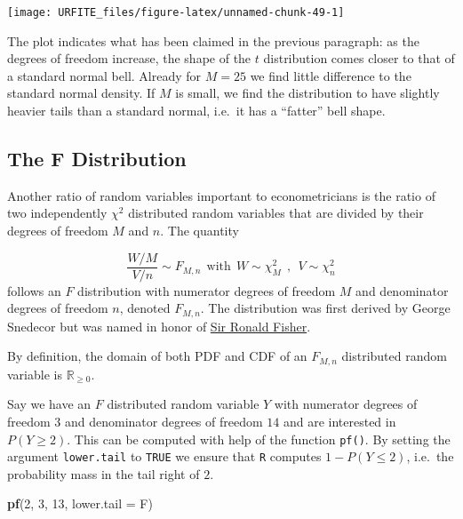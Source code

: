 \documentclass[]{book}
\newenvironment{Shaded}{\begin{snugshade}}{\end{snugshade}}
\newcommand{\KeywordTok}[1]{\textcolor[rgb]{0.13,0.29,0.53}{\textbf{#1}}}
\newcommand{\DataTypeTok}[1]{\textcolor[rgb]{0.13,0.29,0.53}{#1}}
\newcommand{\DecValTok}[1]{\textcolor[rgb]{0.00,0.00,0.81}{#1}}
\newcommand{\NormalTok}[1]{#1}
\theoremstyle{definition}
\theoremstyle{definition}
\theoremstyle{definition}
\theoremstyle{remark}
\begin{document}
\begin{center}\texttt{[image: URFITE\_files/figure-latex/unnamed-chunk-49-1]} \end{center}

The plot indicates what has been claimed in the previous paragraph: as
the degrees of freedom increase, the shape of the \(t\) distribution
comes closer to that of a standard normal bell. Already for \(M=25\) we
find little difference to the standard normal density. If \(M\) is
small, we find the distribution to have slightly heavier tails than a
standard normal, i.e.~it has a ``fatter'' bell shape.

\subsection*{The F Distribution}\label{the-f-distribution}

Another ratio of random variables important to econometricians is the
ratio of two independently \(\chi^2\) distributed random variables that
are divided by their degrees of freedom \(M\) and \(n\). The quantity

\[ \frac{W/M}{V/n} \sim F_{M,n} \ \ \text{with} \ \ W \sim \chi^2_M \ \ , \ \ V \sim \chi^2_n \]
follows an \(F\) distribution with numerator degrees of freedom \(M\)
and denominator degrees of freedom \(n\), denoted \(F_{M,n}\). The
distribution was first derived by George Snedecor but was named in honor
of \href{https://en.wikipedia.org/wiki/Ronald_Fisher}{Sir Ronald
Fisher}.

By definition, the domain of both PDF and CDF of an \(F_{M,n}\)
distributed random variable is \(\mathbb{R}_{\geq0}\).

Say we have an \(F\) distributed random variable \(Y\) with numerator
degrees of freedom \(3\) and denominator degrees of freedom \(14\) and
are interested in \(P(Y \geq 2)\). This can be computed with help of the
function \texttt{pf()}. By setting the argument \texttt{lower.tail} to
\texttt{TRUE} we ensure that \texttt{R} computes \(1- P(Y \leq 2)\),
i.e.~the probability mass in the tail right of \(2\).

\begin{Shaded}
\begin{Highlighting}[]
\KeywordTok{pf}\NormalTok{(}\DecValTok{2}\NormalTok{, }\DecValTok{3}\NormalTok{, }\DecValTok{13}\NormalTok{, }\DataTypeTok{lower.tail =}\NormalTok{ F)}
\end{Highlighting}
\end{Shaded}
\end{document}
